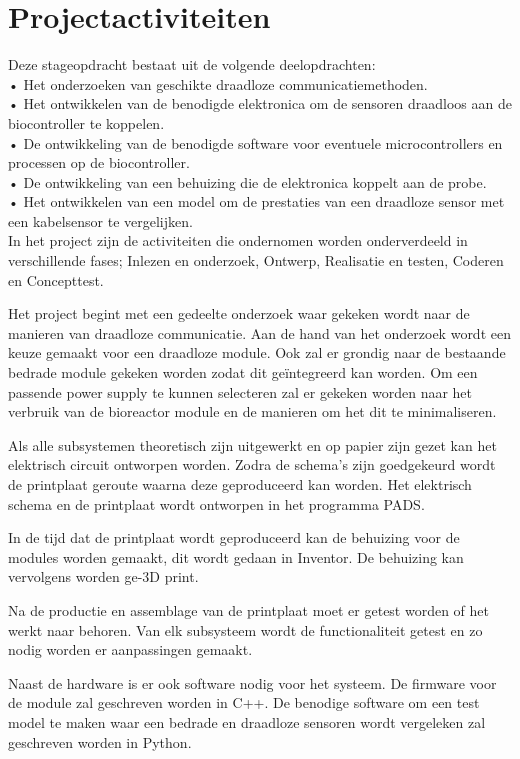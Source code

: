 \section{Projectactiviteiten}\label{sec:activiteiten}
Deze stageopdracht bestaat uit de volgende deelopdrachten:\\
•	Het onderzoeken van geschikte draadloze communicatiemethoden.\\
•	Het ontwikkelen van de benodigde elektronica om de sensoren draadloos aan de biocontroller te koppelen.\\
•	De ontwikkeling van de benodigde software voor eventuele microcontrollers en processen op de biocontroller.\\
•	De ontwikkeling van een behuizing die de elektronica koppelt aan de probe.\\
•	Het ontwikkelen van een model om de prestaties van een draadloze sensor met een kabelsensor te vergelijken.\\


In het project zijn de activiteiten die ondernomen worden onderverdeeld in verschillende fases; Inlezen en onderzoek, Ontwerp, Realisatie en testen, Coderen en Concepttest.

Het project begint met een gedeelte onderzoek waar gekeken wordt naar de manieren van draadloze communicatie. Aan de hand van het onderzoek wordt een keuze gemaakt voor een draadloze module. Ook zal er grondig naar de bestaande bedrade module gekeken worden zodat dit geïntegreerd kan worden. Om een passende power supply te kunnen selecteren zal er gekeken worden naar het verbruik van de bioreactor module en de manieren om het dit te minimaliseren. 

Als alle subsystemen theoretisch zijn uitgewerkt en op papier zijn gezet kan het elektrisch circuit ontworpen worden. Zodra de schema's zijn goedgekeurd wordt de printplaat geroute waarna deze geproduceerd kan worden. Het elektrisch schema en de printplaat wordt ontworpen in het programma PADS. 

In de tijd dat de printplaat wordt geproduceerd kan de behuizing voor de modules worden gemaakt, dit wordt gedaan in Inventor. De behuizing kan vervolgens worden ge-3D print.

Na de productie en assemblage van de printplaat moet er getest worden of het werkt naar behoren. Van elk subsysteem wordt de functionaliteit getest en zo nodig worden er aanpassingen gemaakt. 

Naast de hardware is er ook software nodig voor het systeem. De firmware voor de module zal geschreven worden in C++. De benodige software om een test model te maken waar een bedrade en draadloze sensoren wordt vergeleken zal geschreven worden in Python. 

